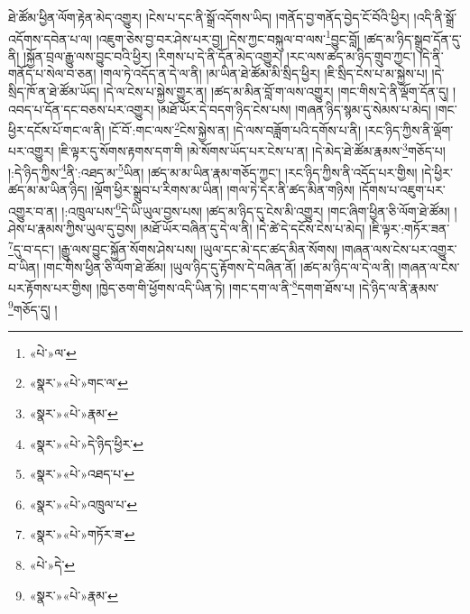 ཐེ་ཚོམ་ཕྱིན་ལོག་རྟེན་མེད་འགྱུར། །ངེས་པ་དང་ནི་སྒྲོ་འདོགས་ཡིད། །གནོད་བྱ་གནོད་བྱེད་ངོ་བོའི་ཕྱིར། །འདི་ནི་སྒྲོ་འདོགས་དབེན་པ་ལ། །འཇུག་ཅེས་བྱ་བར་ཤེས་པར་བྱ། །དེས་ཀྱང་བསྐུལ་བ་ལས་\footnote{«པེ་»ལ་}བྱུང་བློ། །ཚད་མ་ཉིད་སྒྲུབ་དོན་དུ་ནི། །སྐྱོན་བྲལ་རྒྱུ་ལས་བྱུང་བའི་ཕྱིར། །རིགས་པ་དེ་ནི་དོན་མེད་འགྱུར། །རང་ལས་ཚད་མ་ཉིད་གྲུབ་ཀྱང་། །དེ་ནི་གནོད་པ་སེལ་བ་ཅན། །གལ་ཏེ་འདོད་ན་དེ་ལ་ནི། །མ་ཡིན་ཐེ་ཚོམ་མི་སྲིད་ཕྱིར། །ཇི་སྲིད་ངེས་པ་མ་སྐྱེས་པ། །དེ་སྲིད་ཁོ་ན་ཐེ་ཚོམ་ཡོད། །དེ་ལ་ངེས་པ་སྐྱེས་གྱུར་ན། །ཚད་མ་མིན་བློ་ག་ལས་འགྱུར། །གང་གིས་དེ་ནི་ལྡོག་དོན་དུ། །འབད་པ་དོན་དང་བཅས་པར་འགྱུར། །མཐོ་ཡོར་དེ་བདག་ཉིད་ངེས་པས། །གཞན་ཉིད་སྙམ་དུ་སེམས་པ་མེད། །གང་ཕྱིར་དངོས་པོ་གང་ལ་ནི། །ངོ་བོ་:གང་ལས་\footnote{«སྣར་»«པེ་»གང་ལ་}ངེས་སྐྱེས་ན། །དེ་ལས་བཟློག་པའི་དགོས་པ་ནི། །རང་ཉིད་ཀྱིས་ནི་ལྡོག་པར་འགྱུར། །ཇི་ལྟར་དུ་སོགས་རྟགས་དག་གི །མེ་སོགས་ཡོད་པར་ངེས་པ་ན། །དེ་མེད་ཐེ་ཚོམ་རྣམས་\footnote{«སྣར་»«པེ་»རྣམ་}གཅོད་པ། །:དེ་ཉིད་ཀྱིས་\footnote{«སྣར་»«པེ་»དེ་ཉིད་ཕྱིར་}ནི་:འཐད་མ་\footnote{«སྣར་»«པེ་»འཐད་པ་}ཡིན། །ཚད་མ་མ་ཡིན་རྣམ་གཅོད་ཀྱང་། །རང་ཉིད་ཀྱིས་ནི་འདོད་པར་གྱིས། །དེ་ཕྱིར་ཚད་མ་མ་ཡིན་ཉིད། །ལྡོག་ཕྱིར་སྒྲུབ་པ་རིགས་མ་ཡིན། །གལ་ཏེ་དེར་ནི་ཚད་མིན་གཉིས། །དོགས་པ་འཇུག་པར་འགྱུར་བ་ན། །:འཁྲུལ་པས་\footnote{«སྣར་»«པེ་»འཁྲུལ་པ་}དེ་ཡི་ཡུལ་བྱས་པས། །ཚད་མ་ཉིད་དུ་ངེས་མི་འགྱུར། །གང་ཞིག་ཕྱིན་ཅི་ལོག་ཐེ་ཚོམ། །ཤེས་པ་རྣམས་ཀྱིས་ཡུལ་དུ་བྱས། །མཐོ་ཡོར་བཞིན་དུ་དེ་ལ་ནི། །དེ་ཚེ་དེ་དངོས་ངེས་པ་མེད། །ཇི་ལྟར་:གཏོར་ཟན་\footnote{«སྣར་»«པེ་»གཏོར་ཟ་}དུ་བ་དང་། །རྒྱུ་ལས་བྱུང་སྐྱོན་སོགས་ཤེས་པས། །ཡུལ་དང་མེ་དང་ཚད་མིན་སོགས། །གཞན་ལས་ངེས་པར་འགྱུར་བ་ཡིན། །གང་གིས་ཕྱིན་ཅི་ལོག་ཐེ་ཚོམ། །ཡུལ་ཉིད་དུ་རྟོགས་དེ་བཞིན་ནོ། །ཚད་མ་ཉིད་ལ་དེ་ལ་ནི། །གཞན་ལ་ངེས་པར་རྟོགས་པར་གྱིས། །ཁྱེད་ཅག་གི་ཕྱོགས་འདི་ཡིན་ཏེ། །གང་དག་ལ་ནི་\footnote{«པེ་»དེ་}དགག་ཐོས་པ། །དེ་ཉིད་ལ་ནི་རྣམས་\footnote{«སྣར་»«པེ་»རྣམ་}གཅོད་དུ། །

